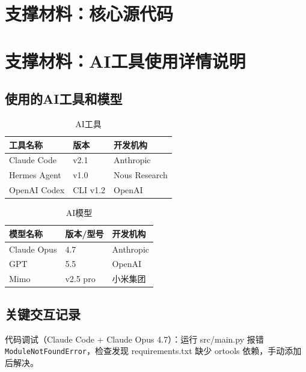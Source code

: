 \documentclass[a4paper,12pt]{article}
\begin{document}
\appendix
\section{支撑材料：核心源代码}




\section{支撑材料：AI工具使用详情说明}

\subsection{使用的AI工具和模型}

\begin{table}[H]
\centering
\caption{AI工具}
\begin{tabular}{lll}
\toprule
工具名称 & 版本 & 开发机构 \\
\midrule
Claude Code & v2.1 & Anthropic \\
Hermes Agent & v1.0 & Nous Research \\
OpenAI Codex & CLI v1.2 & OpenAI \\
\bottomrule
\end{tabular}
\end{table}

\begin{table}[H]
\centering
\caption{AI模型}
\begin{tabular}{lll}
\toprule
模型名称 & 版本/型号 & 开发机构 \\
\midrule
Claude Opus & 4.7 & Anthropic \\
GPT & 5.5 & OpenAI \\
Mimo & v2.5 pro & 小米集团 \\
\bottomrule
\end{tabular}
\end{table}

\subsection{关键交互记录}

代码调试（Claude Code + Claude Opus 4.7）：运行 src/main.py 报错 \texttt{ModuleNotFoundError}，检查发现 requirements.txt 缺少 ortools 依赖，手动添加后解决。
\end{document}
